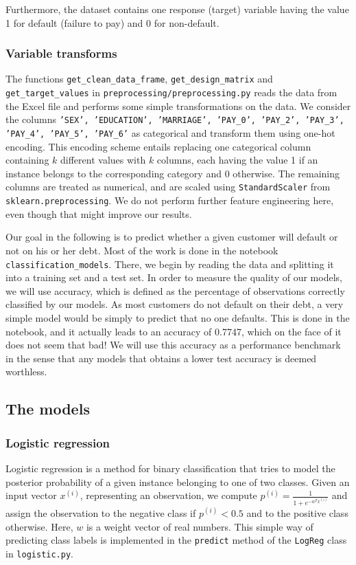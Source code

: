 \documentclass{article}
\begin{document}
Furthermore, the dataset contains one response (target) variable having the value 1 for default (failure to pay) and 0 for non-default.
\subsubsection{Variable transforms}
The functions \texttt{get\_clean\_data\_frame}, \texttt{get\_design\_matrix} and \texttt{get\_target\_values} in \texttt{preprocessing/preprocessing.py} reads the data from the Excel file and performs some simple transformations on the data. We consider the columns \texttt{'SEX',
'EDUCATION',
'MARRIAGE',
'PAY\_0',
'PAY\_2',
'PAY\_3',
'PAY\_4',
'PAY\_5',
'PAY\_6'}
as categorical and transform them using one-hot encoding. This encoding scheme entails replacing one categorical column containing $k$ different values with $k$ columns, each having the value 1 if an instance belongs to the corresponding category and 0 otherwise. The remaining columns are treated as numerical, and are scaled using \texttt{StandardScaler} from \texttt{sklearn.preprocessing}. We do not perform further feature engineering here, even though that might improve our results.

Our goal in the following is to predict whether a given customer will default or not on his or her debt. Most of the work is done in the notebook \texttt{classification\_models}. There, we begin by reading the data and splitting it into a training set and a test set. In order to measure the quality of our models, we will use accuracy, which is defined as the percentage of observations correctly classified by our models. As most customers do not default on their debt, a very simple model would be simply to predict that no one defaults. This is done in the notebook, and it actually leads to an accuracy of 0.7747, which on the face of it does not seem that bad! We will use this accuracy as a performance benchmark in the sense that any models that obtains a lower test accuracy is deemed worthless.

\subsection{The models}
\subsubsection{Logistic regression}
Logistic regression is a method for binary classification that tries to model the posterior probability of a given instance belonging to one of two classes. Given an input vector $x^{(i)}$, representing an observation, we compute $p^{(i)} = \frac{1}{1+e^{-w^T x^{(i)}}}$ and assign the observation to the negative class if $p^(i) < 0.5$ and to the positive class otherwise. Here, $w$ is a weight vector of real numbers. This simple way of predicting class labels is implemented in the \texttt{predict} method of the \texttt{LogReg} class in \texttt{logistic.py}.
\end{document}
